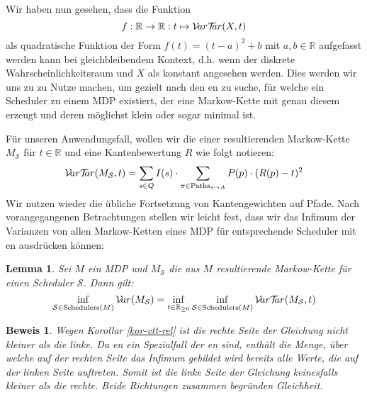 \documentclass[a4paper]{article}
\newcommand{\mc}{Markow-Kette}
\newtheorem{lemma}[satz]{Lemma}
\theoremstyle{nonumberplain}
\newtheorem{beweis}{Beweis}
\begin{document}
Wir haben nun gesehen, dass die Funktion
\[
f : \mathbb{R} \to \mathbb{R} : t \mapsto \mathcal{V}\!ar \mathcal{T}\!\!ar(X,t)
\]
als quadratische Funktion der Form $f(t) = (t-a)^2 + b$ mit $a,b \in \mathbb{R}$ aufgefasst werden kann bei gleichbleibendem Kontext, d.h. wenn der diskrete Wahrscheinlichkeitsraum und $X$ als konstant angesehen werden.  Dies werden wir uns zu zu Nutze machen, um gezielt nach den \expect{}en zu suche, für welche ein Scheduler zu einem MDP existiert, der eine \mc{} mit genau diesem \expect{} erzeugt und deren \var{} möglichst klein oder sogar minimal ist.
\begin{comment}
Dabei ergibt sich $a = \mathcal{E}(X)$ und $b = \mvar(X)$:
\begin{align*}
	& & f(t) & =  \sum_{\omega \in \Omega}{P(\omega) \cdot \left((X(\omega)-t)^2\right)} \\
	\implies & & f(t) & = \sum_{\omega \in \Omega}{P(\omega) \cdot \left(t^2 -2tX(\omega) + \left(\mathcal{E}(X)\right)^2 - \left(\mathcal{E}(X)\right)^2 + \left(X(\omega)\right)^2\right)} \\
	\implies & & f(t) & = \left(t - \mathcal{E}(X)\right)^2 - \left(\mathcal{E}(X)\right)^2 + \mathcal{E}(X^2) \\
	\implies & & f(t) & = \left(t - \mathcal{E}(X)\right)^2 + \mvar(X) \\
\end{align*}
\end{comment}

Für unseren Anwendungsfall, wollen wir die \vt{} einer resultierenden \mc{} $M_\mathcal{S}$ für $t \in \mathbb{R}$ und eine Kantenbewertung $R$ wie folgt notieren:
\[
\mathcal{V}\!ar \mathcal{T}\!\!ar(M_{\mathcal{S}},t) = \sum_{s \in Q}{I(s)} \cdot \sum_{\pi \in \mathrm{Paths}_{s \rightarrow A}}{P(p) \cdot (R(p) - t)^2}
\]
Wir nutzen wieder die übliche Fortsetzung von Kantengewichten auf Pfade. Nach vorangegangenen Betrachtungen stellen wir leicht fest, dass wir das Infimum der Varianzen von allen \mc{}n eines MDP für entsprechende Scheduler mit \vt{}en ausdrücken können:
\begin{lemma} Sei $M$ ein MDP und $M_\mathcal{S}$ die aus $M$ resultierende \mc{} für einen Scheduler $\mathcal{S}$. Dann gilt:
\[
\inf_{\mathcal{S} \in \mathrm{Schedulers}(M)}{\mathcal{V}\!ar(M_\mathcal{S})}
=
\inf_{t \in \mathbb{R}_{\geq 0}}{
	\inf_{\mathcal{S} \in \mathrm{Schedulers}(M)}{
		\mathcal{V}\!ar \mathcal{T}\!\!ar(M_\mathcal{S},t)
	}
}
\]
\end{lemma}
\begin{beweis}
	Wegen Korollar \ref{kor-vtt-rel} ist die rechte Seite der Gleichung nicht kleiner als die linke. Da \var{}en ein Spezialfall der \vt{}en sind, enthält die Menge, über welche auf der rechten Seite das Infimum gebildet wird bereits alle Werte, die auf der linken Seite auftreten. Somit ist die linke Seite der Gleichung keinesfalls kleiner als die rechte. Beide Richtungen zusammen begründen Gleichheit.
\end{beweis}
\end{document}
